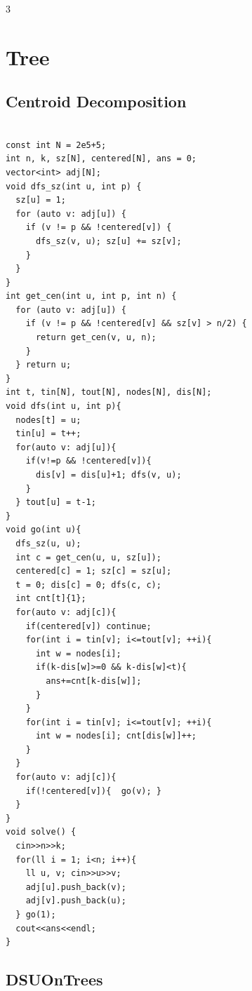 \documentclass[10pt, landscape, a4paper, onesided]{extarticle}
\begin{document}
\begin{multicols*}{3}
\section{Tree}
\subsection{Centroid Decomposition}
\begin{verbatim}

const int N = 2e5+5;
int n, k, sz[N], centered[N], ans = 0;
vector<int> adj[N];
void dfs_sz(int u, int p) {
  sz[u] = 1;
  for (auto v: adj[u]) {
    if (v != p && !centered[v]) {
      dfs_sz(v, u); sz[u] += sz[v];
    }
  }
}
int get_cen(int u, int p, int n) {
  for (auto v: adj[u]) {
    if (v != p && !centered[v] && sz[v] > n/2) {
      return get_cen(v, u, n);
    }
  } return u;
}
int t, tin[N], tout[N], nodes[N], dis[N];
void dfs(int u, int p){
  nodes[t] = u;
  tin[u] = t++;
  for(auto v: adj[u]){
    if(v!=p && !centered[v]){
      dis[v] = dis[u]+1; dfs(v, u);
    }
  } tout[u] = t-1;
}
void go(int u){
  dfs_sz(u, u);
  int c = get_cen(u, u, sz[u]);
  centered[c] = 1; sz[c] = sz[u];
  t = 0; dis[c] = 0; dfs(c, c);
  int cnt[t]{1};
  for(auto v: adj[c]){
    if(centered[v]) continue;
    for(int i = tin[v]; i<=tout[v]; ++i){
      int w = nodes[i];
      if(k-dis[w]>=0 && k-dis[w]<t){
        ans+=cnt[k-dis[w]];
      }
    }
    for(int i = tin[v]; i<=tout[v]; ++i){
      int w = nodes[i]; cnt[dis[w]]++;
    }
  }
  for(auto v: adj[c]){
    if(!centered[v]){  go(v); }
  }
}
void solve() {
  cin>>n>>k;
  for(ll i = 1; i<n; i++){
    ll u, v; cin>>u>>v;
    adj[u].push_back(v);
    adj[v].push_back(u);
  } go(1);
  cout<<ans<<endl;
}
\end{verbatim}

\subsection{DSUOnTrees}
\begin{verbatim}


\end{verbatim}
\end{multicols*}
\end{document}
